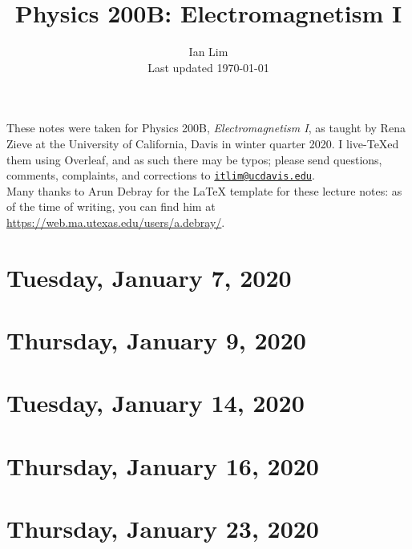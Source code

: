 \documentclass{../mynotes}
\begin{document}
\title{Physics 200B: Electromagnetism I}
\author{Ian Lim\\ Last updated \today}
\maketitle
{\small\noindent These notes were taken for Physics 200B, \emph{Electromagnetism I}, as taught by Rena Zieve at the University of California, Davis in winter quarter 2020. I live-\TeX ed them using Overleaf, and as such there may be typos; please send questions, comments, complaints, and corrections to 
\href{mailto:itlim@ucdavis.edu?subject=200B\%20Lecture\%20Notes}{\texttt{itlim@ucdavis.edu}}.\\
Many thanks to Arun Debray for the {\LaTeX} template for these lecture notes: as of the time of writing, you can find him at \url{https://web.ma.utexas.edu/users/a.debray/}.}

\tableofcontents

\section{Tuesday, January 7, 2020}
	
\section{Thursday, January 9, 2020}
    
    
\section{Tuesday, January 14, 2020}
    
\section{Thursday, January 16, 2020}
    
    
\section{Thursday, January 23, 2020}
    
\end{document}
